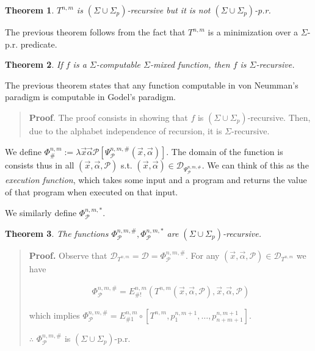 \documentclass[a4paper, 12pt]{article}
\newtheorem{theorem}{Theorem}
\newtheorem{theorem}{Theorem}
\begin{document}
\begin{theorem}
    $T^{n, m}$ is $( \Sigma \cup \Sigma_p )$-recursive but it is not $( \Sigma
    \cup \Sigma_p )$-p.r. 
\end{theorem}

The previous theorem follows from the fact that $T^{n, m}$ is a minimization
over a $\Sigma$-p.r. predicate.

\begin{theorem}
    If $f$ is a $\Sigma$-computable $\Sigma$-mixed function, then $f$ is
    $\Sigma$-recursive.
\end{theorem}

The previous theorem states that any function computable in von Neumman's
paradigm is computable in Godel's paradigm.


\small
\begin{quote}

\textbf{Proof}. The proof consists in showing that $f$ is $( \Sigma \cup
\Sigma_p )$-recursive. Then, due to the alphabet independence of recursion, it
is $\Sigma$-recursive.

\end{quote}
\normalsize

We define $\Phi_{\#}^{n, m} := \lambda \vec{x}\vec{\alpha}\mathcal{P} \left[
\Psi_{\mathcal{P}}^{n, m, \#}(\vec{x}, \vec{\alpha}) \right]$. The domain of the
function is consists thus in all $(\vec{x}, \vec{\alpha}, \mathcal{P})$ s.t.
$(\vec{x}, \vec{\alpha}) \in \mathcal{D}_{\Psi_{\mathcal{P}}^{n, m, \#}}$. We
can think of this as the \textit{execution function}, which takes some input and
a program and returns the value of that program when executed on that input.

We similarly define $\Phi_{\mathcal{P}}^{n, m, *}$.

\begin{theorem}
    The functions $\Phi_{\mathcal{P}}^{n, m, \#}, \Phi_{\mathcal{P}}^{n, m, *}$
    are $(\Sigma \cup \Sigma_p)$-recursive.
\end{theorem}


\small
\begin{quote}

    \textbf{Proof.} Observe that $\mathcal{D}_{T^{n, m}} = \mathcal{D} =
    \Phi_{\mathcal{P}}^{n, m, \#}$. For any $(\vec{x}, \vec{\alpha},
    \mathcal{P}) \in \mathcal{D}_{T^{n, m}}$ we have 

    \begin{align*}
        \Phi_{\mathcal{P}}^{n, m, \#} = E_{\# !}^{n, m} \left( T^{n, m}(\vec{x},
        \vec{\alpha}, \mathcal{P}), \vec{x}, \vec{\alpha}, \mathcal{P} \right) 
    \end{align*}

    which implies $\Phi_{\mathcal{P}}^{n, m, \#} = E_{\# 1}^{n, m} \circ \left[
    T^{n, m}, p_1^{n, m+1}, \ldots, p_{n+m+1}^{n, m + 1}\right] $.

    $\therefore $ $\Phi_{\mathcal{P}}^{n, m, \#}$ is $(\Sigma \cup \Sigma_p)$-p.r.

\end{quote}
\normalsize
\end{document}
